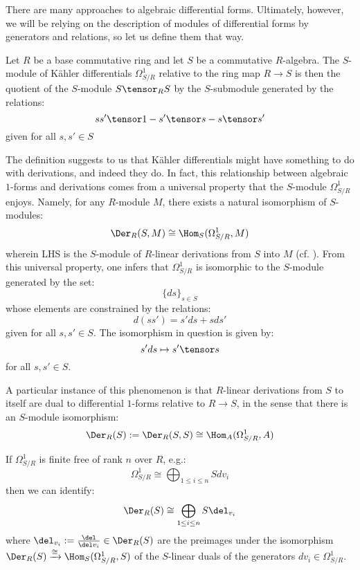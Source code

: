         There are many approaches to algebraic differential forms. Ultimately, however, we will be relying on the description of modules of differential forms by generators and relations, so let us define them that way.
        \begin{definition} \label{def: kahler_differentials}
            Let $R$ be a base commutative ring and let $S$ be a commutative $R$-algebra. The $S$-module of K\"ahler differentials $\Omega^1_{S/R}$ relative to the ring map $R \to S$ is then the quotient of the $S$-module $S \tensor_R S$ by the $S$-submodule generated by the relations:
                $$ss' \tensor 1 - s' \tensor s - s \tensor s'$$
            given for all $s, s' \in S$
        \end{definition}
        \begin{remark} \label{remark: differentials_and_derivations}
            The definition suggests to us that K\"ahler differentials might have something to do with derivations, and indeed they do. In fact, this relationship between algebraic $1$-forms and derivations comes from a universal property that the $S$-module $\Omega^1_{S/R}$ enjoys. Namely, for any $R$-module $M$, there exists a natural isomorphism of $S$-modules:
                $$\Der_R(S, M) \cong \Hom_S(\Omega^1_{S/R}, M)$$
            wherein LHS is the $S$-module of $R$-linear derivations from $S$ into $M$ (cf. \cite[\href{https://stacks.math.columbia.edu/tag/00RO}{Tag 00RO}]{stacks}). From this universal property, one infers that $\Omega^1_{S/R}$ is isomorphic to the $S$-module generated by the set:
                $$\{ds\}_{s \in S}$$
            whose elements are constrained by the relations:
                $$d(ss') = s' ds + s ds'$$
            given for all $s, s' \in S$. The isomorphism in question is given by:
                $$s' ds \mapsto s' \tensor s$$
            for all $s, s' \in S$.
            
            A particular instance of this phenomenon is that $R$-linear derivations from $S$ to itself are dual to differential $1$-forms relative to $R \to S$, in the sense that there is an $S$-module isomorphism:
                $$\Der_R(S) := \Der_R(S, S) \cong \Hom_A(\Omega^1_{S/R}, A)$$
        \end{remark}
        \begin{remark} 
            If $\Omega^1_{S/R}$ is finite free of rank $n$ over $R$, e.g.:
                $$\Omega^1_{S/R} \cong \bigoplus_{1 \leq i \leq n} S dv_i$$
            then we can identify:
                $$\Der_R(S) \cong \bigoplus_{1 \leq i \leq n} S \del_{v_i}$$
            where $\del_{v_i} := \frac{\del}{\del v_i} \in \Der_R(S)$ are the preimages under the isomorphism $\Der_R(S) \xrightarrow[]{\cong} \Hom_S(\Omega^1_{S/R}, S)$ of the $S$-linear duals of the generators $dv_i \in \Omega^1_{S/R}$.
        \end{remark}
        
